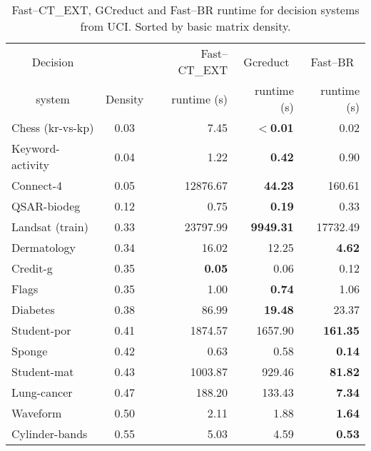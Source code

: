 \documentclass[number,preprint,review,12pt]{elsarticle}
\begin{document}
	\begin{table}[htb]
		\centering
		\caption{Fast--CT\_EXT, GCreduct and Fast--BR runtime for decision systems from UCI. Sorted by basic matrix density.}
		\label{tab:density}
		\begin{tabular}{|l|c|r|r|r|}
			\hline
			\multicolumn{1}{|c|}{Decision}  && Fast--CT\_EXT & \multicolumn{1}{c|}{Gcreduct} & \multicolumn{1}{c|}{Fast--BR}  \\
			\multicolumn{1}{|c|}{system}       & Density & runtime (s) & runtime (s)  & runtime (s)  \\
			\hline
			Chess (kr-vs-kp)          & 0.03    & 7.45          & \textbf{$<$0.01} & 0.02            \\
			Keyword-activity          & 0.04    & 1.22          & \textbf{0.42}    & 0.90            \\
			Connect-4                 & 0.05    & 12876.67      & \textbf{44.23}   & 160.61          \\
			QSAR-biodeg               & 0.12    & 0.75          & \textbf{0.19}    & 0.33            \\
			Landsat (train)           & 0.33    & 23797.99      & \textbf{9949.31} & 17732.49        \\
			Dermatology               & 0.34    & 16.02         & 12.25            & \textbf{4.62}   \\
			Credit-g                  & 0.35    & \textbf{0.05} & 0.06             & 0.12            \\
			Flags                     & 0.35    & 1.00          & \textbf{0.74}    & 1.06            \\
			Diabetes                  & 0.38    & 86.99         & \textbf{19.48}   & 23.37           \\
			Student-por               & 0.41    & 1874.57       & 1657.90          & \textbf{161.35} \\
			Sponge                    & 0.42    & 0.63          & 0.58             & \textbf{0.14}   \\
			Student-mat               & 0.43    & 1003.87       & 929.46           & \textbf{81.82}  \\
			Lung-cancer               & 0.47    & 188.20        & 133.43           & \textbf{7.34}   \\
			Waveform                  & 0.50    & 2.11          & 1.88             & \textbf{1.64}   \\
			Cylinder-bands            & 0.55    & 5.03          & 4.59             & \textbf{0.53}   \\
			\hline
		\end{tabular}
	\end{table}
	
\end{document}
